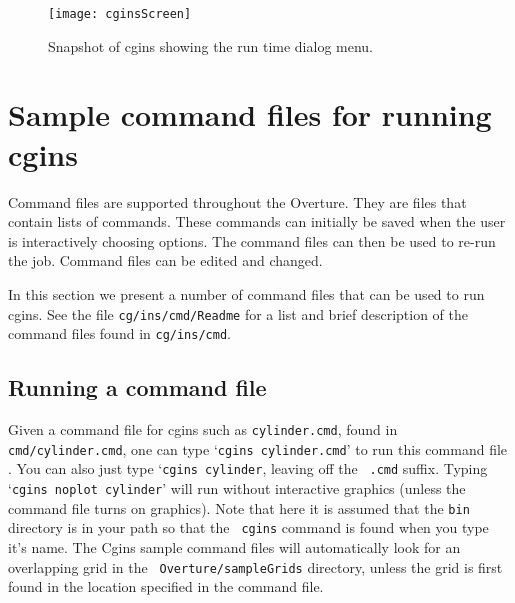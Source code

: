 \documentclass{article}
\newcommand{\Index}[1]{#1\index{#1}}
\begin{document}
  
\begin{figure}[hbt]
\begin{center}
  \texttt{[image: cginsScreen]} \\
  \caption{Snapshot of cgins showing the run time dialog menu. }
  \end{center} 
  \label{fig:runTimeScreen}
\end{figure}

\clearpage
\section{Sample command files for running cgins} \label{sec:demo}

Command files are supported throughout the Overture. They are files
that contain lists of commands. These commands can initially be saved
when the user is interactively choosing options.  The \Index{command files}
can then be used to re-run the job. Command files can be edited and
changed.

In this section we present a number of command files that can be used
to run cgins. See the file {\tt cg/ins/cmd/Readme} for a list and brief description of
the command files found in {\tt cg/ins/cmd}. 

\subsection{Running a command file}

Given a \Index{command file} for cgins such as {\tt cylinder.cmd}, found in {\tt
cmd/cylinder.cmd}, one can type `{\tt cgins cylinder.cmd}' to run this command
file . You can also just type `{\tt cgins cylinder}, leaving off the {\tt
.cmd} suffix. Typing `{\tt cgins noplot cylinder}' will run without
interactive graphics (unless the command file turns on graphics). Note that here
it is assumed that the {\tt bin} directory is in your path so that the {\tt
cgins} command is found when you type it's name. The Cgins sample
command files will automatically look for an overlapping grid in the {\tt
Overture/sampleGrids} directory, unless the grid is first found in the location
specified in the command file.
\end{document}
